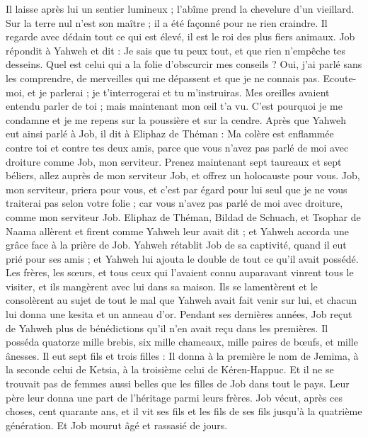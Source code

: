 \begin{multicols}{2}
Il laisse après lui un sentier lumineux ; l'abîme prend la chevelure d'un vieillard.
Sur la terre nul n'est son maître ; il a été façonné pour ne rien craindre.
Il regarde avec dédain tout ce qui est élevé, il est le roi des plus fiers animaux.
\VerseOne{}Job répondit à Yahweh et dit :
Je sais que tu peux tout, et que rien n'empêche tes desseins.
Quel est celui qui a la folie d'obscurcir mes conseils ? Oui, j'ai parlé sans les comprendre, de merveilles qui me dépassent et que je ne connais pas.
Ecoute-moi, et je parlerai ; je t'interrogerai et tu m'instruiras.
Mes oreilles avaient entendu parler de toi ; mais maintenant mon œil t'a vu.
C'est pourquoi je me condamne et je me repens sur la poussière et sur la cendre.
Après que Yahweh eut ainsi parlé à Job, il dit à Eliphaz de Théman : Ma colère est enflammée contre toi et contre tes deux amis, parce que vous n'avez pas parlé de moi avec droiture comme Job, mon serviteur.
Prenez maintenant sept taureaux et sept béliers, allez auprès de mon serviteur Job, et offrez un holocauste pour vous. Job, mon serviteur, priera pour vous, et c'est par égard pour lui seul que je ne vous traiterai pas selon votre folie ; car vous n'avez pas parlé de moi avec droiture, comme mon serviteur Job.
Eliphaz de Théman, Bildad de Schuach, et Tsophar de Naama allèrent et firent comme Yahweh leur avait dit ; et Yahweh accorda une grâce face à la prière de Job.
Yahweh rétablit Job de sa captivité, quand il eut prié pour ses amis ; et Yahweh lui ajouta le double de tout ce qu'il avait possédé.
Les frères, les sœurs, et tous ceux qui l'avaient connu auparavant vinrent tous le visiter, et ils mangèrent avec lui dans sa maison. Ils se lamentèrent et le consolèrent au sujet de tout le mal que Yahweh avait fait venir sur lui, et chacun lui donna une kesita et un anneau d'or.
Pendant ses dernières années, Job reçut de Yahweh plus de bénédictions qu'il n'en avait reçu dans les premières. Il posséda quatorze mille brebis, six mille chameaux, mille paires de bœufs, et mille ânesses.
Il eut sept fils et trois filles :
Il donna à la première le nom de Jemima, à la seconde celui de Ketsia, à la troisième celui de Kéren-Happuc.
Et il ne se trouvait pas de femmes aussi belles que les filles de Job dans tout le pays. Leur père leur donna une part de l'héritage parmi leurs frères.
Job vécut, après ces choses, cent quarante ans, et il vit ses fils et les fils de ses fils jusqu'à la quatrième génération.
Et Job mourut âgé et rassasié de jours.
\PPE{}
\end{multicols}
